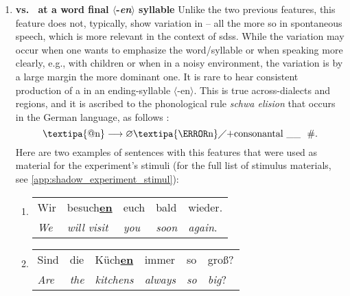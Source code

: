 \begin{enumerate}
	\item \textbf{\textipa{[@n]} vs.\ \textipa{[\s{n}]} at a word final $\langle$-\textit{en}$\rangle$ syllable}
	Unlike the two previous features, this feature does not, typically, show variation in -- all the more so in spontaneous speech, which is more relevant in the context of \acp{sds}.
	While the \textipa{[@n]} variation may occur when one wants to emphasize the word/syllable or when speaking more clearly, e.g., with children or when in a noisy environment, the \textipa{[\s{n}]} variation is by a large margin the more dominant one.
	It is rare to hear consistent production of a \textipa{[@n]} in an ending-syllable $\langle$-en$\rangle$.
	This is true across-dialects and regions, and it is ascribed to the phonological rule \textit{schwa elision} that occurs in the German language, as follows \citep[adapted from][pp.~142--143]{Benware1986phonetics}:
	\begin{equation}
		\text{\textipa{@n}}\longrightarrow \varnothing \text{\textipa{\s{n}}} \diagup
		\text{+consonantal} \ \_\_ \ \ \text{\#} .
		\label{eq:elision_rule}
	\end{equation}
	Here are two examples of sentences with this features that were used as material for the experiment's stimuli (for the full list of stimulus materials, see \autoref{app:shadow_experiment_stimul}):
	
	\begin{enumerate}[label=\arabic{enumi}\alph*), ref=\arabic{enumi}\alph*.)]
		\item 
		\begin{tabulary}{\linewidth}{LLLLL}
			Wir & besuch\textbf{\underline{en}} & euch & bald & wieder.\\
			\textit{We} & \textit{will visit} & \textit{you} & \textit{soon} & \textit{again}.\\
		\end{tabulary}
		\item
		\begin{tabulary}{\linewidth}{LLLLLL}
			Sind & die & Küch\textbf{\underline{en}} & immer & so & groß?\\
			\textit{Are} & \textit{the} & \textit{kitchens} & \textit{always} & \textit{so} & \textit{big}?\\
		\end{tabulary}
	\end{enumerate}
\end{enumerate}




